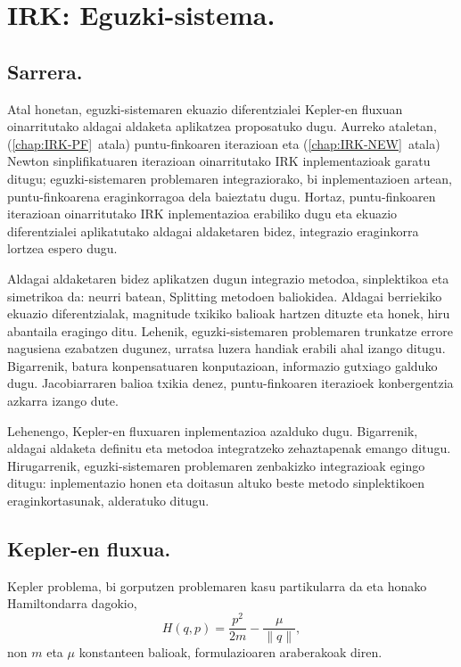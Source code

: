 \chapter{IRK: Eguzki-sistema.}


\section{Sarrera.}
  

Atal honetan, eguzki-sistemaren ekuazio diferentzialei Kepler-en fluxuan oinarritutako aldagai aldaketa aplikatzea proposatuko dugu. Aurreko ataletan, (\ref{chap:IRK-PF}~atala) puntu-finkoaren iterazioan  eta (\ref{chap:IRK-NEW}~atala) Newton sinplifikatuaren iterazioan oinarritutako IRK  inplementazioak garatu ditugu; eguzki-sistemaren problemaren integraziorako, bi inplementazioen artean,  puntu-finkoarena eraginkorragoa dela baieztatu dugu. Hortaz, puntu-finkoaren iterazioan oinarritutako IRK inplementazioa erabiliko dugu eta  ekuazio diferentzialei aplikatutako aldagai aldaketaren bidez, integrazio eraginkorra lortzea espero dugu.  

Aldagai aldaketaren bidez aplikatzen dugun integrazio metodoa, sinplektikoa eta simetrikoa da: neurri batean, Splitting metodoen baliokidea. Aldagai berriekiko ekuazio diferentzialak, magnitude txikiko balioak hartzen dituzte eta honek, hiru abantaila eragingo ditu. Lehenik, eguzki-sistemaren problemaren trunkatze errore nagusiena ezabatzen dugunez, urratsa luzera handiak erabili ahal izango ditugu. Bigarrenik, batura konpensatuaren konputazioan, informazio gutxiago galduko dugu. Jacobiarraren balioa txikia denez, puntu-finkoaren iterazioek konbergentzia azkarra izango dute. 

Lehenengo, Kepler-en fluxuaren inplementazioa azalduko dugu. Bigarrenik, aldagai aldaketa definitu eta metodoa integratzeko zehaztapenak emango ditugu. Hirugarrenik, eguzki-sistemaren problemaren zenbakizko integrazioak egingo ditugu: inplementazio honen eta doitasun altuko beste metodo sinplektikoen eraginkortasunak, alderatuko ditugu.         

 

\section{Kepler-en fluxua.}
   
Kepler problema, bi gorputzen problemaren kasu partikularra da eta  honako Hamiltondarra dagokio,
\begin{equation}
H(q,p)=\frac{p^2}{2m}-\frac{\mu}{\|q\|},
\end{equation}
non $m$ eta $\mu$ konstanteen balioak, formulazioaren araberakoak diren.

